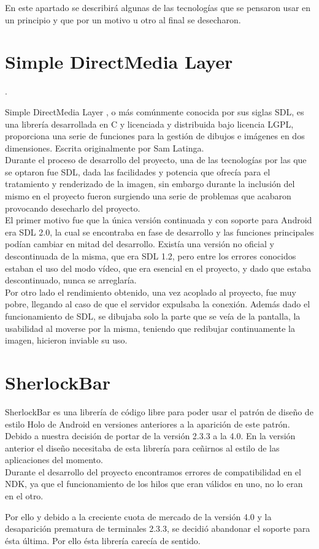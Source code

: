 En este apartado se describirá algunas de las tecnologías que se pensaron usar en un principio y que por un motivo u otro al final se desecharon.

\section{Simple DirectMedia Layer}.

Simple DirectMedia Layer \cite{sdl:sdl}, o más comúnmente conocida por sus siglas SDL, es una librería desarrollada en C y licenciada y distribuida bajo licencia LGPL, proporciona una serie de funciones para la gestión de dibujos e imágenes en dos dimensiones. Escrita originalmente por Sam Latinga.\\

Durante el proceso de desarrollo del proyecto, una de las tecnologías por las que se optaron fue SDL, dada las facilidades y potencia que ofrecía para el tratamiento y renderizado de la imagen, sin embargo durante la inclusión del mismo en el proyecto fueron surgiendo una serie de problemas que acabaron provocando desecharlo del proyecto.\\

El primer motivo fue que la única versión continuada y con soporte para Android era SDL 2.0, la cual se encontraba en fase de desarrollo y las funciones principales podían cambiar en mitad del desarrollo. Existía una versión no oficial y descontinuada de la misma, que era SDL 1.2, pero entre los errores conocidos estaban el uso del modo vídeo, que era esencial en el proyecto, y dado que estaba descontinuado, nunca se arreglaría.\\

Por otro lado el rendimiento obtenido, una vez acoplado al proyecto, fue muy pobre, llegando al caso de que el servidor expulsaba la conexión. Además dado el funcionamiento de SDL, se dibujaba solo la parte que se veía de la pantalla, la usabilidad al moverse por la misma, teniendo que redibujar continuamente la imagen, hicieron inviable su uso.

\section{SherlockBar}

SherlockBar\cite{sherlock:sherlock} es una librería de código libre para poder usar el patrón de diseño de estilo Holo de Android en versiones anteriores a la aparición de este patrón. Debido a nuestra decisión de portar de la versión 2.3.3 a la 4.0. En la versión anterior el diseño necesitaba de esta librería para ceñirnos al estilo de las aplicaciones del momento.\\

Durante el desarrollo del proyecto encontramos errores de compatibilidad en el NDK, ya que el funcionamiento de los hilos que eran válidos en uno, no lo eran en el otro.

Por ello y debido a la creciente cuota de mercado de la versión 4.0 y la desaparición prematura de terminales 2.3.3, se decidió abandonar el soporte para ésta última. Por ello ésta librería carecía de sentido. 
